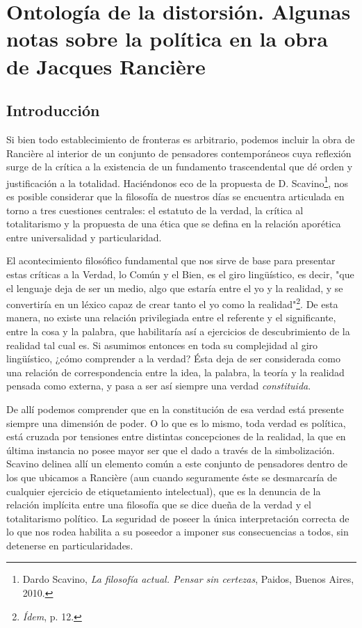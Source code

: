 \documentclass{book}
\begin{document}
\chapter{Ontología de la distorsión. Algunas notas sobre la política en la obra de Jacques Rancière}
\author{Juan Manuel Reynares}

\section{Introducción}

Si bien todo establecimiento de fronteras es arbitrario, podemos incluir
la obra de Rancière al interior de un conjunto de pensadores
contemporáneos cuya reflexión surge de la crítica a la existencia de un
fundamento trascendental que dé orden y justificación a la totalidad.
Haciéndonos eco de la propuesta de D. Scavino\footnote{Dardo Scavino,
  \emph{La filosofía actual. Pensar sin certezas}, Paidos, Buenos Aires,
  2010.}, nos es posible considerar que la filosofía de nuestros días se
encuentra articulada en torno a tres cuestiones centrales: el estatuto
de la verdad, la crítica al totalitarismo y la propuesta de una ética
que se defina en la relación aporética entre universalidad y
particularidad.

El acontecimiento filosófico fundamental que nos sirve de base para
presentar estas críticas a la Verdad, lo Común y el Bien, es el giro
lingüístico, es decir, "que el lenguaje deja de ser un medio, algo que
estaría entre el yo y la realidad, y se convertiría en un léxico capaz
de crear tanto el yo como la realidad"\footnote{\emph{Ídem}, p. 12.}. De
esta manera, no existe una relación privilegiada entre el referente y el
significante, entre la cosa y la palabra, que habilitaría así a
ejercicios de descubrimiento de la realidad tal cual es. Si asumimos
entonces en toda su complejidad al giro lingüístico, ¿cómo comprender a
la verdad? Ésta deja de ser considerada como una relación de
correspondencia entre la idea, la palabra, la teoría y la realidad
pensada como externa, y pasa a ser así siempre una verdad
\emph{constituida}.

De allí podemos comprender que en la constitución de esa verdad está
presente siempre una dimensión de poder. O lo que es lo mismo, toda
verdad es política, está cruzada por tensiones entre distintas
concepciones de la realidad, la que en última instancia no posee mayor
ser que el dado a través de la simbolización. Scavino delinea allí un
elemento común a este conjunto de pensadores dentro de los que ubicamos
a Rancière (aun cuando seguramente éste se desmarcaría de cualquier
ejercicio de etiquetamiento intelectual), que es la denuncia de la
relación implícita entre una filosofía que se dice dueña de la verdad y
el totalitarismo político. La seguridad de poseer la única
interpretación correcta de lo que nos rodea habilita a su poseedor a
imponer sus consecuencias a todos, sin detenerse en particularidades.
\end{document}
